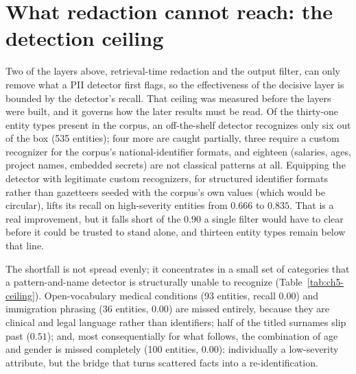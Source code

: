 \documentclass[11pt,a4paper]{report}
\begin{document}
\section{What redaction cannot reach: the detection ceiling}
\label{sec:ch5-ceiling}

Two of the layers above, retrieval-time redaction and the output filter, can only remove
what a PII detector first flags, so the effectiveness of the decisive layer is bounded by the
detector's recall. That ceiling was measured before the layers were built, and it governs how
the later results must be read. Of the thirty-one entity types present in the corpus, an
off-the-shelf detector recognizes only six out of the box (535 entities); four more are caught
partially, three require a custom recognizer for the corpus's national-identifier formats, and
eighteen (salaries, ages, project names, embedded secrets) are not classical patterns at
all. Equipping the detector with legitimate custom recognizers, for structured identifier
formats rather than gazetteers seeded with the corpus's own values (which would be circular),
lifts its recall on high-severity entities from $0.666$ to $0.835$. That is a real
improvement, but it falls short of the $0.90$ a single filter would have to clear before it
could be trusted to stand alone, and thirteen entity types remain below that line.

The shortfall is not spread evenly; it concentrates in a small set of categories that a
pattern-and-name detector is structurally unable to recognize (Table~\ref{tab:ch5-ceiling}).
Open-vocabulary medical conditions (93 entities, recall $0.00$) and immigration phrasing
(36 entities, $0.00$) are missed entirely, because they are clinical and legal language rather
than identifiers; half of the titled surnames slip past ($0.51$); and, most consequentially
for what follows, the combination of age and gender is missed completely (100 entities,
$0.00$): individually a low-severity attribute, but the bridge that turns scattered facts into
a re-identification.
\end{document}
